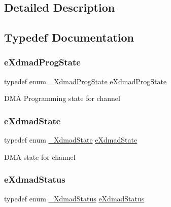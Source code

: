 \subsection{Detailed Description}


\subsection{Typedef Documentation}
\mbox{\label{group__dmad__structs_gae5f8d9cd578ec745f050ebe575bc5753}} 
\subsubsection{\texorpdfstring{eXdmadProgState}{eXdmadProgState}}
{\footnotesize\ttfamily typedef enum \mbox{\hyperlink{group__dmad__structs_gaea9ca6ac14cc448af9be1515bd2205c5}{\+\_\+\+Xdmad\+Prog\+State}}  \mbox{\hyperlink{group__dmad__structs_gae5f8d9cd578ec745f050ebe575bc5753}{e\+Xdmad\+Prog\+State}}}

D\+MA Programming state for channel \mbox{\label{group__dmad__structs_ga82216e1cb5c7ed88c6e2d2e841a736fe}} 
\subsubsection{\texorpdfstring{eXdmadState}{eXdmadState}}
{\footnotesize\ttfamily typedef enum \mbox{\hyperlink{group__dmad__structs_gab11875bdf8f31a2c76972640dcf13d89}{\+\_\+\+Xdmad\+State}}  \mbox{\hyperlink{group__dmad__structs_ga82216e1cb5c7ed88c6e2d2e841a736fe}{e\+Xdmad\+State}}}

D\+MA state for channel \mbox{\label{group__dmad__structs_gae8f2d3dcc5f2bd3d05b76fd622eff70a}} 
\subsubsection{\texorpdfstring{eXdmadStatus}{eXdmadStatus}}
{\footnotesize\ttfamily typedef enum \mbox{\hyperlink{group__dmad__structs_gaec02ce64b667fbde91b1a90f4c61e3ca}{\+\_\+\+Xdmad\+Status}}  \mbox{\hyperlink{group__dmad__structs_gae8f2d3dcc5f2bd3d05b76fd622eff70a}{e\+Xdmad\+Status}}}

